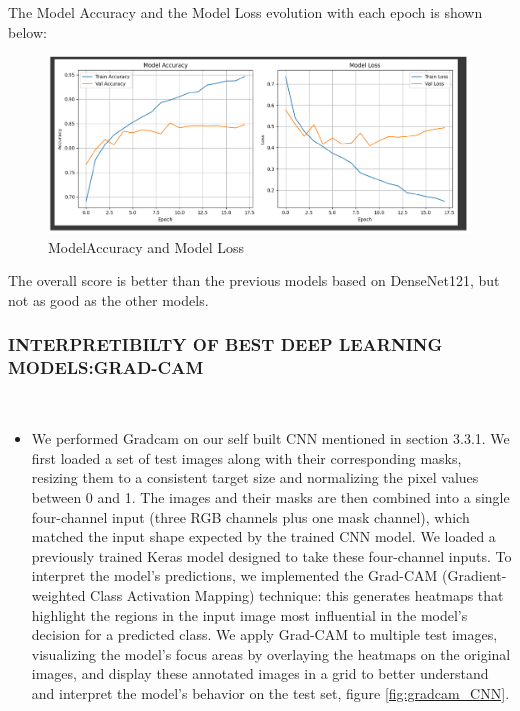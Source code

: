 \documentclass{article}
\begin{document}
The Model Accuracy and the Model Loss evolution with each epoch is shown below:

\begin{figure}[H]
    \centering
    \includegraphics[width=0.8\linewidth]{DN121graph2.png}
    \caption{ModelAccuracy and Model Loss}
    \label{fig:DN121graph2}
\end{figure}

The overall score is  better than the previous models based on DenseNet121, but not as good as the other models.

\subsubsection{INTERPRETIBILTY OF BEST DEEP LEARNING MODELS:GRAD-CAM}\mbox{}\\

\begin{itemize}
    \item We performed Gradcam on our self built CNN mentioned in section 3.3.1. We first loaded a set of test images along with their corresponding masks, resizing them to a consistent target size and normalizing the pixel values between 0 and 1. The images and their masks are then combined into a single four-channel input (three RGB channels plus one mask channel), which matched the input shape expected by the trained CNN model. We loaded a previously trained Keras model designed to take these four-channel inputs. To interpret the model’s predictions, we implemented the Grad-CAM (Gradient-weighted Class Activation Mapping) technique: this generates heatmaps that highlight the regions in the input image most influential in the model’s decision for a predicted class. We apply Grad-CAM to multiple test images, visualizing the model’s focus areas by overlaying the heatmaps on the original images, and display these annotated images in a grid to better understand and interpret the model’s behavior on the test set, figure \ref{fig:gradcam_CNN}.
\end{itemize}
\end{document}

